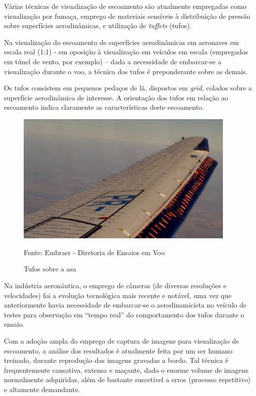 \documentclass[12pt, a4paper]{article}
\newcommand{\source}[1]{\vspace{-5pt} \caption*{ Fonte: {#1}} }
\begin{document}
Várias técnicas de visualização de escoamento \cite{fisher1988flow} são atualmente empregadas como visualização por fumaça, emprego de materiais sensíveis à distribuição de pressão sobre superfícies aerodinâmicas, e utilização de \emph{tuffets} (tufos).

Na visualização do escoamento de superfícies aerodinâmicas em aeronaves em escala real (1:1) - em oposição à visualização em veículos em escala (empregados em túnel de vento, por exemplo) – dada a necessidade de embarcar-se a visualização durante o voo, a técnica dos tufos é preponderante sobre as demais.

Os tufos consistem em pequenos pedaços de lã, dispostos em \emph{grid}, colados sobre a superfície aerodinâmica de interesse. A orientação dos tufos em relação ao escoamento indica claramente as características deste escoamento.

\begin{figure} [ht]
    \centering
    \includegraphics[width=0.95\textwidth]{tuffets.png}
    \caption{Tufos sobre a asa}
    \source{Embraer - Diretoria de Ensaios em Voo}
    \label{fig:tuffets}
\end{figure}

Na indústria aeronáutica, o emprego de câmeras (de diversas resoluções e velocidades) foi a evolução tecnológica mais recente e notável, uma vez que anteriormente havia necessidade de embarcar-se o aerodinamicista no veículo de testes para observação em “tempo real” do comportamento dos tufos durante o ensaio.

Com a adoção ampla do emprego de captura de imagens para visualização de escoamento, a análise dos resultados é atualmente feita por um ser humano treinado, durante reprodução das imagens gravadas a bordo. Tal técnica é frequentemente cansativa, extensa e maçante, dado o enorme volume de imagens normalmente adquiridas, além de bastante suscetível a erros (processo repetitivo) e altamente demandante.
\end{document}
